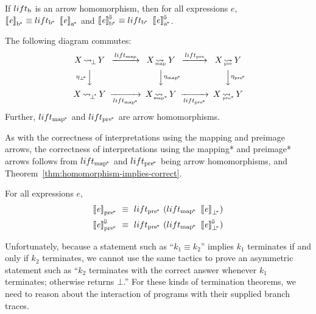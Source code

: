 \begin{corollary}
\label{cor:astore-semantic-correctness}
If $lift_\mathrm{b}$ is an arrow homomorphism, then for all expressions $\mathit{e}$, $\left\llbracket{\mathit{e}}\right\rrbracket_\mathrm{b^{\mspace{-2mu}*}} \equiv lift_\mathrm{b^{\mspace{-2mu}*}}~\left\llbracket{\mathit{e}}\right\rrbracket_\mathrm{a^{\mspace{-2mu}*}}$ and $\left\llbracket{\mathit{e}}\right\rrbracket^{\mspace{-2mu}\Downarrow\mspace{-2mu}}_\mathrm{b^{\mspace{-2mu}*}} \equiv lift_\mathrm{b^{\mspace{-2mu}*}}~\left\llbracket{\mathit{e}}\right\rrbracket^{\mspace{-2mu}\Downarrow\mspace{-2mu}}_\mathrm{a^{\mspace{-2mu}*}}$.%
\end{corollary}

\begin{corollary}
The following diagram commutes:
\begin{equation}
\begin{CD}
X \botto Y   @>\liftmap>>   X \mapto Y   @>\liftpre>>   X \preto Y \\
@V{\eta_\pbot}VV             @VV{\eta\pmap}V              @VV{\eta\ppre}V\\
X \pbotto Y  @>>\liftpmap>  X \pmapto Y  @>>\liftppre>  X \ppreto Y
\end{CD}
\end{equation}
Further, $lift_\mathrm{map^{\mspace{-2mu}*}}$ and $lift_\mathrm{pre^{\mspace{-2mu}*}}$ are arrow homomorphisms.
\end{corollary}

As with the correctness of interpretations using the mapping and preimage arrows, the correctness of interpretations using the mapping* and preimage* arrows follows from $lift_\mathrm{map^{\mspace{-2mu}*}}$ and $lift_\mathrm{pre^{\mspace{-2mu}*}}$ being arrow homomorphisms, and Theorem~\ref{thm:homomorphism-implies-correct}.

\begin{corollary}
For all expressions $\mathit{e}$,
\begin{equation}
\begin{aligned}
	\meaningof{\mathit{e}}\ppre &\ \equiv \ \liftppre~(\liftpmap~\meaningof{\mathit{e}}_\pbot)
\\
	\meaningofconv{\mathit{e}}\ppre &\ \equiv \ \liftppre~(\liftpmap~\meaningofconv{\mathit{e}}_\pbot)
\end{aligned}
\end{equation}
\end{corollary}

Unfortunately, because a statement such as ``$k_1 \equiv k_2$'' implies $k_1$ terminates if and only if $k_2$ terminates, we cannot use the same tactics to prove an asymmetric statement such as ``$k_2$ terminates with the correct answer whenever $k_1$ terminates; otherwise returns $\bot$.''
For these kinds of termination theorems, we need to reason about the interaction of programs with their supplied branch traces.


